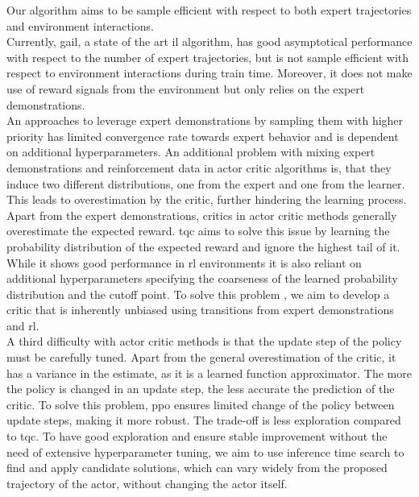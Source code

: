 Our algorithm aims to be sample efficient with respect to both expert trajectories and environment interactions. \\

Currently, \ac{gail}, a state of the art \ac{il} algorithm, has good asymptotical performance with respect to the number of expert trajectories, but is not sample efficient 
with respect to environment interactions during train time. Moreover, it does not make use of reward signals from the environment but only relies on the expert demonstrations.\\ 

An approaches to leverage expert demonstrations by sampling them with higher priority \cite{vecerik2018leveraging} has limited convergence rate towards expert behavior and is dependent on additional hyperparameters. 
An additional problem with mixing expert demonstrations and reinforcement data in actor critic algorithms is, that they induce two different distributions, one from the expert and one from 
the learner. This leads to overestimation by the critic, further hindering the learning process. \\

Apart from the expert demonstrations, critics in actor critic methods generally overestimate the expected reward. \ac{tqc} \cite{TQC_Paper} aims to solve this issue by learning the 
probability distribution of the expected reward and ignore the highest tail of it. While it shows good performance in \ac{rl} environments 
it is also reliant on additional hyperparameters 
specifying the coarseness of the learned probability distribution and the cutoff point. To solve this problem , we aim to develop a critic that is inherently unbiased using transitions from expert demonstrations 
and \ac{rl}.\\

A third difficulty with actor critic methods is that the update step of the policy must be carefully tuned. Apart from the general overestimation of the critic, it has a variance in the estimate, 
as it is a learned function approximator. The more the policy is changed in an update step, the less accurate the prediction of the critic. To solve this problem, \ac{ppo} ensures limited change of the policy 
between update steps, making it more robust. The trade-off is less exploration compared to \ac{tqc}. To have good exploration 
and ensure stable improvement without the need of extensive hyperparameter tuning, we aim to use inference time search to find and apply candidate solutions, which can vary widely from the 
proposed trajectory of the actor, without changing the actor itself. \\

